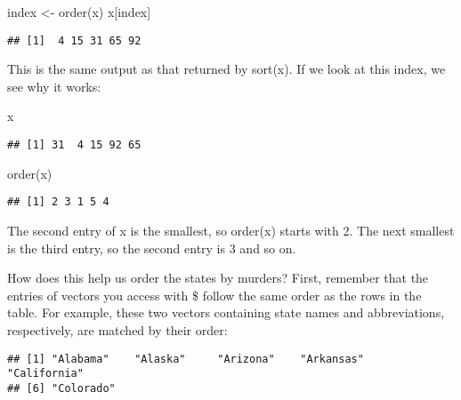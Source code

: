 \documentclass[
]{article}
\newenvironment{Shaded}{\begin{snugshade}}{\end{snugshade}}
\newcommand{\DecValTok}[1]{\textcolor[rgb]{0.00,0.00,0.81}{#1}}
\newcommand{\FunctionTok}[1]{\textcolor[rgb]{0.00,0.00,0.00}{#1}}
\newcommand{\NormalTok}[1]{#1}
\newcommand{\OtherTok}[1]{\textcolor[rgb]{0.56,0.35,0.01}{#1}}
\newcommand{\SpecialCharTok}[1]{\textcolor[rgb]{0.00,0.00,0.00}{#1}}
\begin{document}
\begin{Shaded}
\begin{Highlighting}[]
\NormalTok{index }\OtherTok{\textless{}{-}} \FunctionTok{order}\NormalTok{(x)}
\NormalTok{x[index]}
\end{Highlighting}
\end{Shaded}

\begin{verbatim}
## [1]  4 15 31 65 92
\end{verbatim}

This is the same output as that returned by sort(x). If we look at this
index, we see why it works:

\begin{Shaded}
\begin{Highlighting}[]
\NormalTok{x}
\end{Highlighting}
\end{Shaded}

\begin{verbatim}
## [1] 31  4 15 92 65
\end{verbatim}

\begin{Shaded}
\begin{Highlighting}[]
\FunctionTok{order}\NormalTok{(x)}
\end{Highlighting}
\end{Shaded}

\begin{verbatim}
## [1] 2 3 1 5 4
\end{verbatim}

The second entry of x is the smallest, so order(x) starts with 2. The
next smallest is the third entry, so the second entry is 3 and so on.

How does this help us order the states by murders? First, remember that
the entries of vectors you access with \$ follow the same order as the
rows in the table. For example, these two vectors containing state names
and abbreviations, respectively, are matched by their order:

\begin{Shaded}
\end{Shaded}

\begin{verbatim}
## [1] "Alabama"    "Alaska"     "Arizona"    "Arkansas"   "California"
## [6] "Colorado"
\end{verbatim}
\end{document}
